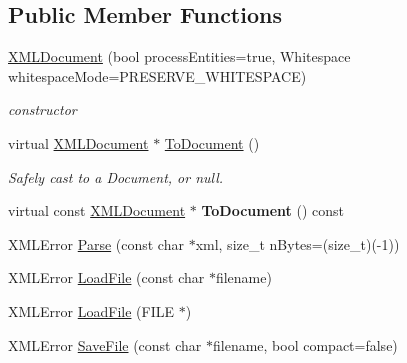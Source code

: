\subsection*{Public Member Functions}
\begin{DoxyCompactItemize}
\item 
\mbox{\label{classCPlantBox_1_1tinyxml2_1_1XMLDocument_a9e309542b25bac6e0ccb388da9c6680b}} 
\hyperlink{classCPlantBox_1_1tinyxml2_1_1XMLDocument_a9e309542b25bac6e0ccb388da9c6680b}{X\+M\+L\+Document} (bool process\+Entities=true, Whitespace whitespace\+Mode=P\+R\+E\+S\+E\+R\+V\+E\+\_\+\+W\+H\+I\+T\+E\+S\+P\+A\+CE)
\begin{DoxyCompactList}\small\item\em constructor \end{DoxyCompactList}\item 
\mbox{\label{classCPlantBox_1_1tinyxml2_1_1XMLDocument_a2b44bdfba1c3c680e7cb1526fd72cd07}} 
virtual \hyperlink{classCPlantBox_1_1tinyxml2_1_1XMLDocument}{X\+M\+L\+Document} $\ast$ \hyperlink{classCPlantBox_1_1tinyxml2_1_1XMLDocument_a2b44bdfba1c3c680e7cb1526fd72cd07}{To\+Document} ()
\begin{DoxyCompactList}\small\item\em Safely cast to a Document, or null. \end{DoxyCompactList}\item 
\mbox{\label{classCPlantBox_1_1tinyxml2_1_1XMLDocument_ae0302b0dbb0ed0406f7ed0ca19f9424b}} 
virtual const \hyperlink{classCPlantBox_1_1tinyxml2_1_1XMLDocument}{X\+M\+L\+Document} $\ast$ {\bfseries To\+Document} () const
\item 
X\+M\+L\+Error \hyperlink{classCPlantBox_1_1tinyxml2_1_1XMLDocument_a471df8c13bad00822e3d57d4d60176ad}{Parse} (const char $\ast$xml, size\+\_\+t n\+Bytes=(size\+\_\+t)(-\/1))
\item 
X\+M\+L\+Error \hyperlink{classCPlantBox_1_1tinyxml2_1_1XMLDocument_aab50b8d76fb1bb23a26e44f79de10ecf}{Load\+File} (const char $\ast$filename)
\item 
X\+M\+L\+Error \hyperlink{classCPlantBox_1_1tinyxml2_1_1XMLDocument_ac569059c86b1a4305b76a96f9cbb2aac}{Load\+File} (F\+I\+LE $\ast$)
\item 
X\+M\+L\+Error \hyperlink{classCPlantBox_1_1tinyxml2_1_1XMLDocument_a5c24e667bb4e75ef562e9c7002de08f5}{Save\+File} (const char $\ast$filename, bool compact=false)

\end{DoxyCompactItemize}
